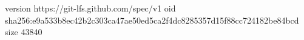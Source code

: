 version https://git-lfs.github.com/spec/v1
oid sha256:e9a533b8ec42b2c303ca47ae50ed5ca2f4dc8285357d15f88cc724182be84bcd
size 43840
